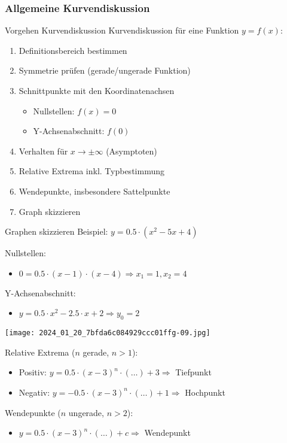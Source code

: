 \subsubsection{Allgemeine Kurvendiskussion}

\begin{KR}{Vorgehen Kurvendiskussion}
    Kurvendiskussion für eine Funktion $y=f(x)$:
    \begin{enumerate}
      \item Definitionsbereich bestimmen
      \item Symmetrie prüfen (gerade/ungerade Funktion)
      \item Schnittpunkte mit den Koordinatenachsen
        \begin{itemize}
            \item Nullstellen: $f(x) = 0$
            \item Y-Achsenabschnitt: $f(0)$
        \end{itemize}
      \item Verhalten für $x \rightarrow \pm\infty$ (Asymptoten)
      \item Relative Extrema inkl. Typbestimmung
      \item Wendepunkte, insbesondere Sattelpunkte
      \item Graph skizzieren
    \end{enumerate}
\end{KR}

\begin{concept}{Graphen skizzieren}
    Beispiel: $y=0.5 \cdot\left(x^{2}-5 x+4\right)$

    Nullstellen:
    \begin{itemize}
      \item $0=0.5 \cdot(x-1) \cdot(x-4) \Rightarrow x_{1}=1, x_{2}=4$
    \end{itemize}

    Y-Achsenabschnitt:
    \begin{itemize}
      \item $y=0.5 \cdot x^{2}-2.5 \cdot x+2 \Rightarrow y_{0}=2$
    \end{itemize}

    \begin{center}
    \texttt{[image: 2024\_01\_20\_7bfda6c084929ccc01ffg-09.jpg]}
    \end{center}

    Relative Extrema ($n$ gerade, $n>1$):
    \begin{itemize}
      \item Positiv: $y=0.5 \cdot(x-3)^{n} \cdot(\ldots)+3 \Rightarrow$ Tiefpunkt
      \item Negativ: $y=-0.5 \cdot(x-3)^{n} \cdot(\ldots)+1 \Rightarrow$ Hochpunkt
    \end{itemize}

    Wendepunkte ($n$ ungerade, $n>2$):
    \begin{itemize}
      \item $y=0.5 \cdot(x-3)^{n} \cdot(\ldots)+c \Rightarrow$ Wendepunkt
    \end{itemize}
\end{concept}

